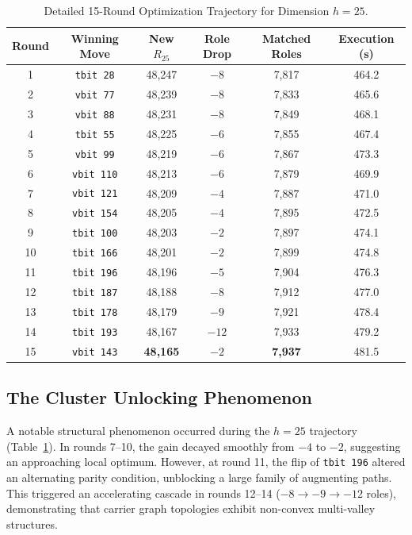 \documentclass[11pt,a4paper]{article}
\begin{document}
\begin{table}[ht]
\centering
\caption{Detailed 15-Round Optimization Trajectory for Dimension $h=25$.}
\label{tab:rounds}
\vspace{0.5em}
\begin{tabular}{cccccc}
\toprule
\textbf{Round} & \textbf{Winning Move} & \textbf{New $R_{25}$} & \textbf{Role Drop} & \textbf{Matched Roles} & \textbf{Execution (s)} \\
\midrule
1 & \texttt{tbit 28} & 48,247 & $-8$ & 7,817 & 464.2 \\
2 & \texttt{vbit 77} & 48,239 & $-8$ & 7,833 & 465.6 \\
3 & \texttt{vbit 88} & 48,231 & $-8$ & 7,849 & 468.1 \\
4 & \texttt{tbit 55} & 48,225 & $-6$ & 7,855 & 467.4 \\
5 & \texttt{vbit 99} & 48,219 & $-6$ & 7,867 & 473.3 \\
6 & \texttt{vbit 110} & 48,213 & $-6$ & 7,879 & 469.9 \\
7 & \texttt{vbit 121} & 48,209 & $-4$ & 7,887 & 471.0 \\
8 & \texttt{vbit 154} & 48,205 & $-4$ & 7,895 & 472.5 \\
9 & \texttt{tbit 100} & 48,203 & $-2$ & 7,897 & 474.1 \\
10 & \texttt{tbit 166} & 48,201 & $-2$ & 7,899 & 474.8 \\
11 & \texttt{tbit 196} & 48,196 & $-5$ & 7,904 & 476.3 \\
12 & \texttt{tbit 187} & 48,188 & $-8$ & 7,912 & 477.0 \\
13 & \texttt{tbit 178} & 48,179 & $-9$ & 7,921 & 478.4 \\
14 & \texttt{tbit 193} & 48,167 & $-12$ & 7,933 & 479.2 \\
15 & \texttt{vbit 143} & \textbf{48,165} & $-2$ & \textbf{7,937} & 481.5 \\
\bottomrule
\end{tabular}
\end{table}

\subsection{The Cluster Unlocking Phenomenon}
A notable structural phenomenon occurred during the $h=25$ trajectory (Table~\ref{tab:rounds}). In rounds 7--10, the gain decayed smoothly from $-4$ to $-2$, suggesting an approaching local optimum. However, at round 11, the flip of \texttt{tbit 196} altered an alternating parity condition, unblocking a large family of augmenting paths. This triggered an accelerating cascade in rounds 12--14 ($-8 \to -9 \to -12$ roles), demonstrating that carrier graph topologies exhibit non-convex multi-valley structures.
\end{document}
